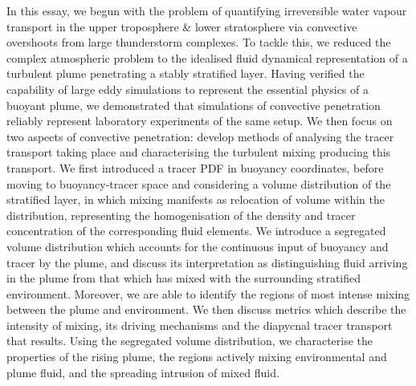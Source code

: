 \documentclass[a4paper]{article}
\begin{document}
In this essay, we begun with the problem of quantifying irreversible water vapour transport in the upper
troposphere \& lower stratosphere via convective overshoots from large thunderstorm complexes. To tackle this,
we reduced the complex atmospheric problem to the idealised fluid dynamical representation of a turbulent
plume penetrating a stably stratified layer. Having verified the capability of large eddy simulations to
represent the essential physics of a buoyant plume, we demonstrated that simulations of convective penetration
reliably represent laboratory experiments of the same setup. We then focus on two aspects of convective
penetration: develop methods of analysing the tracer transport taking place and characterising the turbulent
mixing producing this transport. We first introduced a tracer PDF in buoyancy coordinates, before moving to
buoyancy-tracer space and considering a volume distribution of the stratified layer, in which mixing manifests
as relocation of volume within the distribution, representing the homogenisation of the density and tracer
concentration of the corresponding fluid elements. We introduce a segregated volume distribution which
accounts for the continuous input of buoyancy and tracer by the plume, and discuss its interpretation as
distinguishing fluid arriving in the plume from that which has mixed with the surrounding stratified environment.
Moreover, we are able to identify the regions of most intense mixing between the plume and environment. We
then discuss metrics which describe the intensity of mixing, its driving mechanisms and the diapycnal tracer
transport that results. Using the segregated volume distribution, we characterise the properties of the rising
plume, the regions actively mixing environmental and plume fluid, and the spreading intrusion of mixed fluid. 
\end{document}
